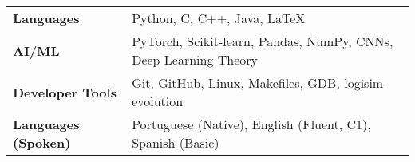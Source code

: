 \documentclass[a4paper,12pt]{article}
\begin{document}
\begin{tabularx}{\linewidth}{@{}l X@{}}
\textbf{Languages} & Python, C, C++, Java, LaTeX \\
\textbf{AI/ML} & PyTorch, Scikit-learn, Pandas, NumPy, CNNs, Deep Learning Theory \\
\textbf{Developer Tools} & Git, GitHub, Linux, Makefiles, GDB, logisim-evolution \\
\textbf{Languages (Spoken)} & Portuguese (Native), English (Fluent, C1), Spanish (Basic)\\
\end{tabularx}

\vfill
{}
\end{document}
